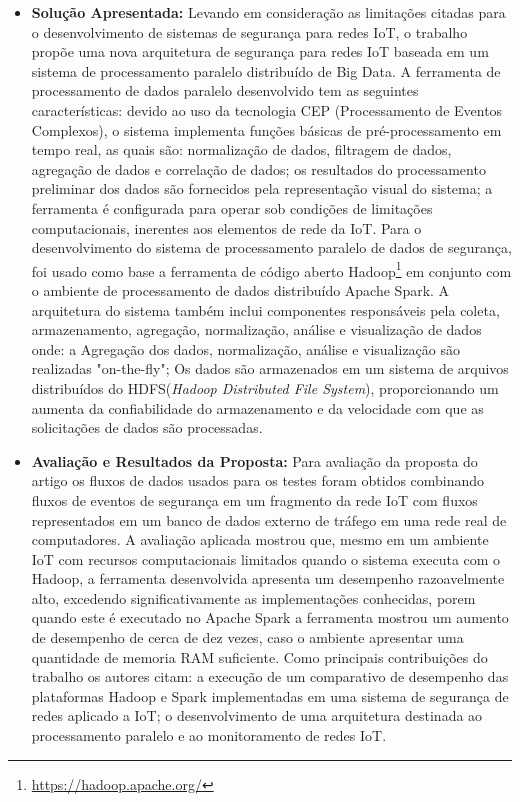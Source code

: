 \documentclass[tid,table]{texufpel} %
\begin{document}
\begin{itemize}
	\item \textbf{Solução Apresentada:} Levando em consideração as limitações citadas para o desenvolvimento de sistemas de segurança para redes IoT, o trabalho propõe uma nova arquitetura de segurança para redes IoT baseada em um sistema de processamento paralelo distribuído de Big Data. A ferramenta de processamento de dados paralelo desenvolvido tem as seguintes características: devido ao uso da tecnologia CEP (Processamento de Eventos Complexos), o sistema implementa funções básicas de pré-processamento em tempo real, as quais são: normalização de dados, filtragem de dados, agregação de dados e correlação de dados; os resultados do processamento preliminar dos dados são fornecidos pela representação visual do sistema; a ferramenta é configurada para operar sob condições de limitações computacionais, inerentes aos elementos de rede da IoT. Para o desenvolvimento do sistema de processamento paralelo de dados de segurança, foi usado como base a ferramenta de código aberto Hadoop\footnote{\url{https://hadoop.apache.org/}} em conjunto com o ambiente de processamento de dados distribuído Apache Spark. A arquitetura do sistema também inclui componentes responsáveis pela coleta, armazenamento, agregação, normalização, análise e visualização de dados onde: a Agregação dos dados, normalização, análise e visualização são realizadas "on-the-fly"; Os dados são armazenados em um sistema de arquivos distribuídos do HDFS(\textit{Hadoop Distributed File System}), proporcionando um aumenta da confiabilidade do armazenamento e da velocidade com que as solicitações de dados são processadas.
	

	\item \textbf{Avaliação e Resultados da Proposta:} Para avaliação da proposta do artigo os fluxos de dados usados para os testes foram obtidos combinando fluxos de eventos de segurança em um fragmento da rede IoT com fluxos representados em um banco de dados externo de tráfego em uma rede real de computadores. A avaliação aplicada mostrou que, mesmo em um ambiente IoT com recursos computacionais limitados quando o sistema executa com o Hadoop, a ferramenta desenvolvida apresenta um desempenho razoavelmente alto, excedendo significativamente as implementações conhecidas, porem quando este é executado no Apache Spark a ferramenta mostrou um aumento de desempenho de cerca de dez vezes, caso o ambiente apresentar uma quantidade de memoria RAM suficiente. Como principais contribuições do trabalho os autores citam: a execução de um comparativo de desempenho das plataformas Hadoop e Spark implementadas em uma sistema de segurança de redes aplicado a IoT; o desenvolvimento de uma arquitetura destinada ao processamento paralelo e ao monitoramento de redes IoT. 
	
	
	
	
\end{itemize}
\end{document}
